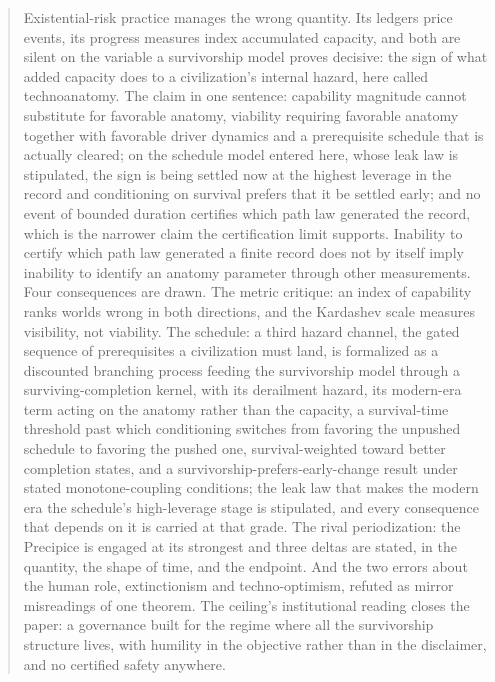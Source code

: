\maketitle

\begin{abstract}
Existential-risk practice manages the wrong quantity. Its ledgers price
events, its progress measures index accumulated capacity, and both are
silent on the variable a survivorship model proves decisive: the sign of
what added capacity does to a civilization's internal hazard, here called
technoanatomy. The claim in one sentence: capability magnitude cannot substitute for
favorable anatomy, viability requiring favorable anatomy together with
favorable driver dynamics and a prerequisite schedule that is actually
cleared; on the schedule model entered here, whose leak law is
stipulated, the sign is being settled now at the highest leverage in the
record and conditioning on survival prefers that it be settled early;
and no event of bounded duration certifies which path law generated the record, which is the narrower claim the certification limit supports. Inability to certify which path law generated a finite record does not by itself imply inability to identify an anatomy parameter through other measurements. Four consequences
are drawn. The metric critique: an index of capability ranks worlds wrong
in both directions, and the Kardashev scale measures visibility, not
viability. The schedule: a third hazard channel, the gated sequence of
prerequisites a civilization must land, is formalized as a discounted
branching process feeding the survivorship model through a
surviving-completion kernel, with its derailment hazard, its modern-era
term acting on the anatomy rather than the capacity, a survival-time
threshold past which conditioning switches from favoring the unpushed
schedule to favoring the pushed one, survival-weighted toward better
completion states, and a
survivorship-prefers-early-change result under stated monotone-coupling
conditions; the leak law that makes the modern era the schedule's
high-leverage stage is stipulated, and every consequence that depends on
it is carried at that grade.
The rival periodization: the Precipice is engaged at its strongest and
three deltas are stated, in the quantity, the shape of time, and the
endpoint. And the two errors about the human role, extinctionism and
techno-optimism, refuted as mirror misreadings of one theorem. The
ceiling's institutional reading closes the paper: a governance built for
the regime where all the survivorship structure lives, with humility in
the objective rather than in the disclaimer, and no certified safety
anywhere.
\end{abstract}

